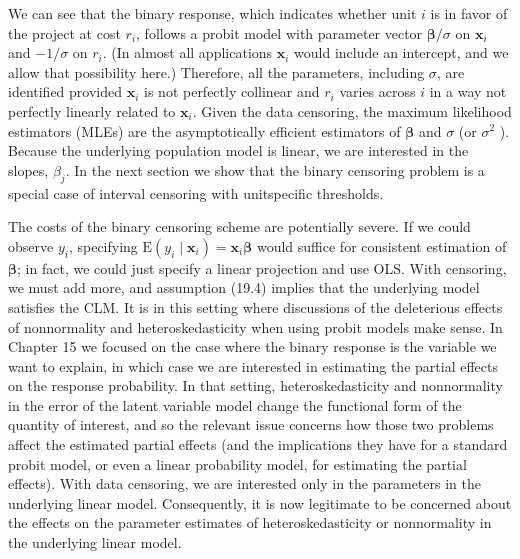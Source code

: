 \documentclass[10pt]{article}
\begin{document}
We can see that the binary response, which indicates whether unit $i$ is in favor of the project at cost $r_{i}$, follows a probit model with parameter vector $\boldsymbol{\beta} / \sigma$ on $\mathbf{x}_{i}$ and $-1 / \sigma$ on $r_{i}$. (In almost all applications $\mathbf{x}_{i}$ would include an intercept, and we allow that possibility here.) Therefore, all the parameters, including $\sigma$, are identified provided $\mathbf{x}_{i}$ is not perfectly collinear and $r_{i}$ varies across $i$ in a way not perfectly linearly related to $\mathbf{x}_{i}$. Given the data censoring, the maximum likelihood estimators (MLEs) are the asymptotically efficient estimators of $\boldsymbol{\beta}$ and $\sigma$ (or $\sigma^{2}$ ). Because the underlying population model is linear, we are interested in the slopes, $\beta_{j}$. In the next section we show that the binary censoring problem is a special case of interval censoring with unitspecific thresholds.

The costs of the binary censoring scheme are potentially severe. If we could observe $y_{i}$, specifying $\mathrm{E}\left(y_{i} \mid \mathbf{x}_{i}\right)=\mathbf{x}_{i} \boldsymbol{\beta}$ would suffice for consistent estimation of $\boldsymbol{\beta}$; in fact, we could just specify a linear projection and use OLS. With censoring, we must add more, and assumption (19.4) implies that the underlying model satisfies the CLM. It is in this setting where discussions of the deleterious effects of nonnormality and heteroskedasticity when using probit models make sense. In Chapter 15 we focused on the case where the binary response is the variable we want to explain, in which case we are interested in estimating the partial effects on the response probability. In that setting, heteroskedasticity and nonnormality in the error of the latent variable model change the functional form of the quantity of interest, and so the relevant issue concerns how those two problems affect the estimated partial effects (and the implications they have for a standard probit model, or even a linear probability model, for estimating the partial effects). With data censoring, we are interested only in the parameters in the underlying linear model. Consequently, it is now legitimate to be concerned about the effects on the parameter estimates of heteroskedasticity or nonnormality in the underlying linear model.
\end{document}
